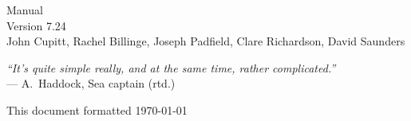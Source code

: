 \documentclass[a4paper,twocolumn,dvips]{book}
\begin{document}

\begin{titlepage}
\thispagestyle{empty}
\begin{center}
\huge
\nip{} Manual\\[0.2em]
\large Version 7.24\\
\vspace{0.5in}
\large
John Cupitt, 
Rachel Billinge,
Joseph Padfield, 
Clare Richardson, 
David Saunders\\ 
\end{center}

\vspace{3in}

\begin{center}
\noindent
\emph{``It's quite simple really, and at the same time, rather 
complicated.''} \\
--- A.\ Haddock, Sea captain (rtd.)
\end{center}

\vspace{3in}

\noindent
\small{This document formatted \today}
\setcounter{page}{1}
\end{titlepage}

\tableofcontents
\thispagestyle{plain}

\listoffigures
\thispagestyle{plain}

\listoftables
\thispagestyle{plain}

\blankpage
{}
\thispagestyle{plain}
\cfoot{}







\appendix

\end{document}
